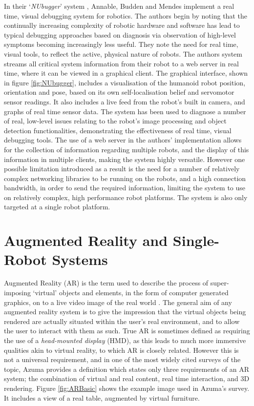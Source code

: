 In their `\textit{NUbugger}' system \cite{Annable:2014}, Annable, Budden and Mendes implement a real time, visual debugging system for robotics. The authors begin by noting that the continually increasing complexity of robotic hardware and software has lead to typical debugging approaches based on diagnosis via observation of high-level symptoms becoming increasingly less useful. They note the need for real time, visual tools, to reflect the active, physical nature of robots. The authors system \cite{Annable:2014} streams all critical system information from their robot to a web server in real time, where it can be viewed in a graphical client. The graphical interface, shown in figure \ref{fig:NUbugger}, includes a visualisation of the humanoid robot position, orientation and pose, based on its own self-localisation belief and servomotor sensor readings. It also includes a live feed from the robot's built in camera, and graphs of real time sensor data. The system has been used to diagnose a number of real, low-level issues \cite{Annable:2014} relating to the robot's image processing and object detection functionalities, demonstrating the effectiveness of real time, visual debugging tools. The use of a web server in the authors' implementation \cite{Annable:2014} allows for the collection of information regarding multiple robots, and the display of this information in multiple clients, making the system highly versatile. However one possible limitation introduced as a result is the need for a number of relatively complex networking libraries to be running on the robots, and a high connection bandwidth, in order to send the required information, limiting the system to use on relatively complex, high performance robot platforms. The system is also only targeted at a single robot platform.


\section{Augmented Reality and Single-Robot Systems} \label{AugmentedReality}
Augmented Reality (AR) is the term used to describe the process of super-imposing `virtual' objects and elements, in the form of computer generated graphics, on to a live video image of the real world \cite{Azuma:1997}. The general aim of any augmented reality system is to give the impression that the virtual objects being rendered are actually situated within the user's real environment, and to allow the user to interact with them as such. True AR is sometimes defined as requiring the use of a \textit{head-mounted display} (HMD), as this leads to much more immersive qualities akin to virtual reality, to which AR is closely related. However this is not a universal requirement, and in one of the most widely cited surveys of the topic, Azuma \cite{Azuma:1997} provides a definition which states only three requirements of an AR system; the combination of virtual and real content, real time interaction, and 3D rendering. Figure \ref{fig:ARBasic} shows the example image used in Azuma's \cite{Azuma:1997} survey. It includes a view of a real table, augmented by virtual furniture.

